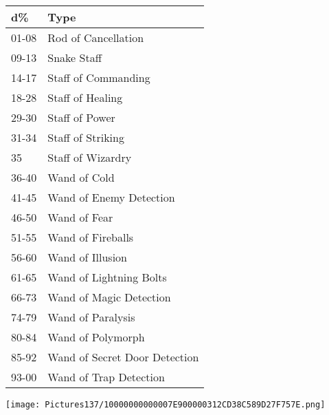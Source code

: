 \documentclass[a4paper,twoside,openany,10pt]{book}
\begin{document}
\begin{multicols}{2}
\begin{tabular*}{0.93\linewidth}{@{\extracolsep{\fill}}ll}
\textbf{d\%} & \textbf{Type} \\\toprule
01-08 & Rod of Cancellation \\\hline
09-13 & Snake Staff \\\hline
14-17 & Staff of Commanding \\\hline
18-28 & Staff of Healing \\\hline
29-30 & Staff of Power \\\hline
31-34 & Staff of Striking \\\hline
35 & Staff of Wizardry \\\hline
36-40 & Wand of Cold \\\hline
41-45 & Wand of Enemy Detection \\\hline
46-50 & Wand of Fear \\\hline
51-55 & Wand of Fireballs \\\hline
56-60 & Wand of Illusion \\\hline
61-65 & Wand of Lightning Bolts \\\hline
66-73 & Wand of Magic Detection \\\hline
74-79 & Wand of Paralysis \\\hline
80-84 & Wand of Polymorph \\\hline
85-92 & Wand of Secret Door Detection \\\hline
93-00 & Wand of Trap Detection \\\bottomrule
\end{tabular*}

\end{multicols}

\vfill

 \texttt{[image: Pictures137/10000000000007E900000312CD38C589D27F757E.png]} 
 
 \pagebreak
 
\end{document}
